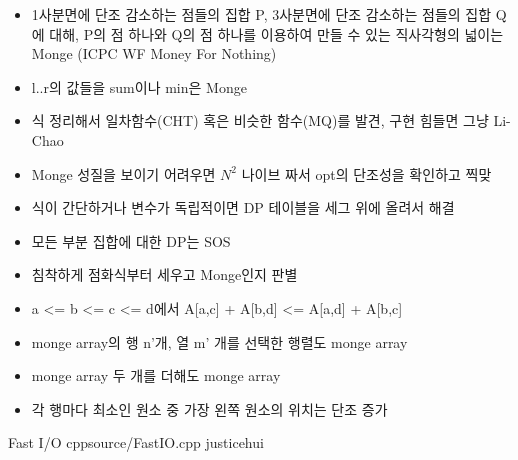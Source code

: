 \documentclass[landscape, 10pt, a4paper, oneside, twocolumn]{extarticle}
\begin{document}
\begin{itemize}
    \item 1사분면에 단조 감소하는 점들의 집합 P, 3사분면에 단조 감소하는 점들의 집합 Q에 대해, P의 점 하나와 Q의 점 하나를 이용하여 만들 수 있는 직사각형의 넓이는 Monge (ICPC WF Money For Nothing)
    \item l..r의 값들을 sum이나 min은 Monge

    \item 식 정리해서 일차함수(CHT) 혹은 비슷한 함수(MQ)를 발견, 구현 힘들면 그냥 Li-Chao
    \item Monge 성질을 보이기 어려우면 $N^2$ 나이브 짜서 opt의 단조성을 확인하고 찍맞
    \item 식이 간단하거나 변수가 독립적이면 DP 테이블을 세그 위에 올려서 해결
    \item 모든 부분 집합에 대한 DP는 SOS
    \item 침착하게 점화식부터 세우고 Monge인지 판별
\end{itemize}

\begin{itemize}
    \item a <= b <= c <= d에서 A[a,c] + A[b,d] <= A[a,d] + A[b,c]
    \item monge array의 행 n'개, 열 m' 개를 선택한 행렬도 monge array
    \item monge array 두 개를 더해도 monge array
    \item 각 행마다 최소인 원소 중 가장 왼쪽 원소의 위치는 단조 증가
\end{itemize}

\Algorithm
{Fast I/O}
{}
{}
{cpp}{source/FastIO.cpp}
{justicehui}
\end{document}
